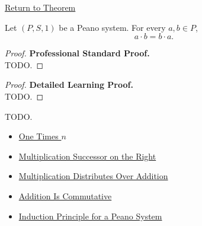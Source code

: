 \newpage
{}
\label{prf:multiplication-commutative}

\begin{remark*}[Return]
\hyperref[thm:multiplication-commutative]{Return to Theorem}
\end{remark*}

\begin{theorem*}
Let $(P,S,1)$ be a Peano system. For every $a,b \in P$,
\[
a \cdot b = b \cdot a.
\]
\end{theorem*}

\begin{proof}
\textbf{Professional Standard Proof.}~\\
TODO.
\end{proof}

\begin{proof}
\textbf{Detailed Learning Proof.}~\\
TODO.
\end{proof}

\begin{remark*}
TODO.
\end{remark*}

\begin{dependencies}
\begin{itemize}
  \item \hyperref[thm:one-times-n]{One Times $n$}
  \item \hyperref[thm:multiplication-successor-on-right]{Multiplication Successor on the Right}
  \item \hyperref[thm:multiplication-distributes-over-addition]{Multiplication Distributes Over Addition}
  \item \hyperref[thm:addition-commutative]{Addition Is Commutative}
  \item \hyperref[thm:induction-principle-for-peano-system]{Induction Principle for a Peano System}
\end{itemize}
\end{dependencies}
